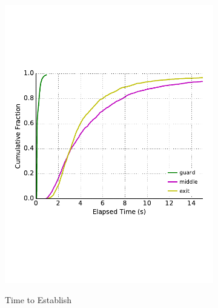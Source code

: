 \begin{figure} \centering
	\begin{subfigure}[t]{0.32\textwidth} \centering
\includegraphics[trim={0 3cm 0 3cm}, clip, width=1.0\textwidth]{images/payment_establish.pdf}
		\label{fig:stats_a}
		\caption{Time to Establish}
	\end{subfigure}
	\begin{subfigure}[t]{0.32\textwidth} \centering

\end{subfigure}
\end{figure}
